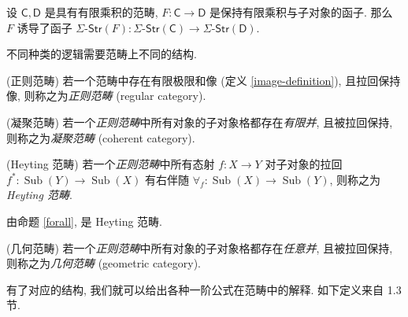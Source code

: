 \begin{prop}
	{}
	设 $\mathsf C,\mathsf D$ 是具有有限乘积的范畴,
	$F \colon \mathsf C \to \mathsf D$ 是保持有限乘积与子对象的函子. 那么 $F$ 诱导了函子
	$\Sigma\text{-}\mathsf{Str}(F)\colon \Sigma\text{-}\mathsf{Str}(\mathsf C) \to \Sigma\text{-}\mathsf{Str}(\mathsf D)$.
\end{prop}

不同种类的逻辑需要范畴上不同的结构.

\begin{definition}
	{(正则范畴)}
	若一个范畴中存在有限极限和像 (定义 \ref{image-definition}), 且拉回保持像, 则称之为\emph{正则范畴} (regular category).
\end{definition}

\begin{definition}
	[label={coherent-category}]
	{(凝聚范畴)}
	若一个\emph{正则范畴}中所有对象的子对象格都存在\emph{有限并}, 且被拉回保持, 则称之为\emph{凝聚范畴} (coherent category).
\end{definition}

\begin{definition}
	[label={Heyting-category}]
	{(Heyting 范畴)}
	若一个\emph{正则范畴}中所有态射 $f\colon X\to Y$ 对子对象的拉回 $f^*\colon \operatorname{Sub}(Y)\to\operatorname{Sub}(X)$ 有右伴随 $\forall_f\colon \operatorname{Sub}(X)\to \operatorname{Sub}(Y)$, 则称之为 \emph{Heyting 范畴}.
\end{definition}

由命题 \ref{forall}, \topos{}是 Heyting 范畴.

\begin{definition}
	{(几何范畴)}
	若一个\emph{正则范畴}中所有对象的子对象格都存在\emph{任意并}, 且被拉回保持, 则称之为\emph{几何范畴} (geometric category).
\end{definition}

有了对应的结构, 我们就可以给出各种一阶公式在范畴中的解释. 如下定义来自 \cite{TST} 1.3 节.

